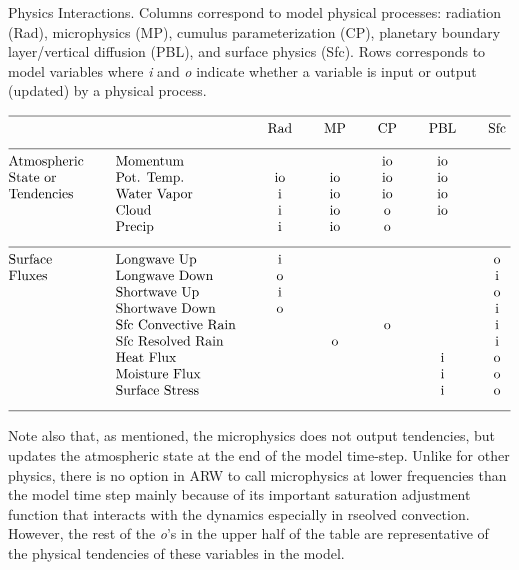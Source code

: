 \begin{table}
\caption{Physics Interactions. Columns correspond to
model physical processes: radiation (Rad),
microphysics (MP), cumulus parameterization (CP), planetary boundary layer/vertical diffusion
(PBL), and surface physics (Sfc). Rows corresponds to
model variables where {\em i} and {\em o} indicate whether a variable is
input or output (updated) by a physical process.}
\label{physics interaction table}
$$\vbox
{\halign{#\hfil \qquad & #\hfil \qquad & \hfil#\hfil \qquad & \hfil#\hfil
\qquad & \hfil#\hfil \qquad &  \hfil#\hfil \qquad & \hfil#\hfil \cr
\multispan7\hrulefill \cr
                &              & Rad       & MP           & CP           & PBL      &   Sfc   \cr
\multispan7\hrulefill \cr
Atmospheric     &  Momentum    &           &              &      io       &  io     &           \cr
State or        &  Pot. Temp.  &   io      &     io       &     io       &  io     &           \cr
Tendencies      &  Water Vapor &    i      &     io       &     io       &  io     &           \cr
                &  Cloud       &    i      &     io       &      o       &  io     &           \cr
                &  Precip      &    i      &     io       &      o       &         &           \cr
\multispan7\hrulefill \cr
Surface         &  Longwave Up &    i      &              &              &         &    o      \cr
Fluxes          &  Longwave Down &  o      &              &              &         &    i      \cr
                &  Shortwave Up &   i      &              &              &         &    o      \cr
                &  Shortwave Down & o      &              &              &         &    i      \cr
                &  Sfc Convective Rain &   &              &      o       &         &    i      \cr
                &  Sfc Resolved Rain &     &      o       &              &         &    i      \cr
                &  Heat Flux &             &              &              &   i     &    o      \cr
                &  Moisture Flux &         &              &              &   i     &    o      \cr
                &  Surface Stress &        &              &              &   i     &    o      \cr
\multispan7\hrulefill \cr
}}$$
\end{table}

Note also that, as mentioned, the microphysics does not output tendencies,
but updates the atmospheric state at the end of the model time-step. Unlike
for other physics, there is no option in ARW to call microphysics at lower
frequencies than the model time step mainly because of its important saturation
adjustment function that interacts with the dynamics especially in rseolved convection.
However, the rest of the {\em o}'s in the upper half of the table are
representative of the physical tendencies of these variables in the model.

